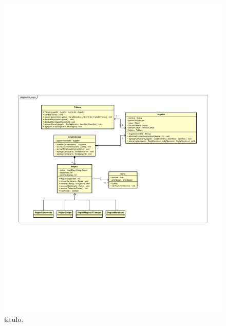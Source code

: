 \begin{figure}[H]
	\centering
	\includegraphics[scale=0.9]{includes/Tablero}
	\caption{titulo.}
	\label{Tablero}
\end{figure}

